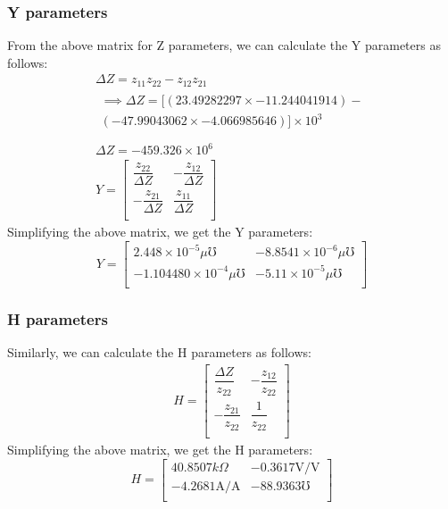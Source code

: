 \documentclass{report}[12pt]
\begin{document}
\subsubsection*{Y parameters}
From the above matrix for Z parameters, we can calculate the Y parameters as follows:
\begin{gather*}
    \Delta Z = z_{11}z_{22}-z_{12}z_{21}\\
    \begin{split}
        \implies \Delta Z = [(23.49282297\times-11.244041914)-\\
        (-47.99043062\times-4.066985646)]\times 10^3\\
    \end{split}\\
    \Delta Z =-459.326\times 10^6\\
    Y = \begin{bmatrix}
        \dfrac{z_{22}}{\Delta Z}  & -\dfrac{z_{12}}{\Delta Z} \\[2ex]
        -\dfrac{z_{21}}{\Delta Z} & \dfrac{z_{11}}{\Delta Z}  \\[2ex]
    \end{bmatrix}
\end{gather*}
Simplifying the above matrix, we get the Y parameters:
$$ Y = \begin{bmatrix}
        2.448 \times 10^{-5}\mu\mho    & -8.8541\times10^{-6}\mu\mho \\[1ex]
        -1.104480\times 10^{-4}\mu\mho & -5.11\times 10^{-5}\mu\mho  \\[1ex]
    \end{bmatrix}
$$
\subsubsection*{H parameters}

Similarly, we can calculate the H parameters as follows:
\begin{gather*}
    H = \begin{bmatrix}
        \dfrac{\Delta Z}{z_{22}} & -\dfrac{z_{12}}{z_{22}} \\[2ex]
        -\dfrac{z_{21}}{z_{22}}  & \dfrac{1}{z_{22}}       \\[2ex]
    \end{bmatrix}
\end{gather*}
Simplifying the above matrix, we get the H parameters:
$$ H = \begin{bmatrix}
        40.8507k\Omega      & -0.3617 \mathrm{V/V} \\[1ex]
        -4.2681\mathrm{A/A} & -88.9363\mho         \\[1ex]
    \end{bmatrix}
$$
\newpage
\end{document}

